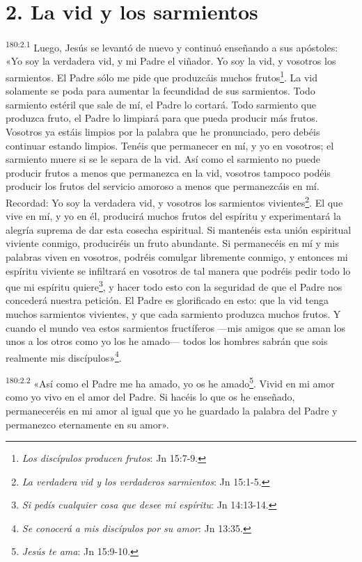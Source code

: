 \section*{2. La vid y los sarmientos}
\par 
\textsuperscript{180:2.1} Luego, Jesús se levantó de nuevo y continuó enseñando a sus apóstoles: «Yo soy la verdadera vid, y mi Padre el viñador. Yo soy la vid, y vosotros los sarmientos. El Padre sólo me pide que produzcáis muchos frutos\footnote{\textit{Los discípulos producen frutos}: Jn 15:7-9.}. La vid solamente se poda para aumentar la fecundidad de sus sarmientos. Todo sarmiento estéril que sale de mí, el Padre lo cortará. Todo sarmiento que produzca fruto, el Padre lo limpiará para que pueda producir más frutos. Vosotros ya estáis limpios por la palabra que he pronunciado, pero debéis continuar estando limpios. Tenéis que permanecer en mí, y yo en vosotros; el sarmiento muere si se le separa de la vid. Así como el sarmiento no puede producir frutos a menos que permanezca en la vid, vosotros tampoco podéis producir los frutos del servicio amoroso a menos que permanezcáis en mí. Recordad: Yo soy la verdadera vid, y vosotros los sarmientos vivientes\footnote{\textit{La verdadera vid y los verdaderos sarmientos}: Jn 15:1-5.}. El que vive en mí, y yo en él, producirá muchos frutos del espíritu y experimentará la alegría suprema de dar esta cosecha espiritual. Si mantenéis esta unión espiritual viviente conmigo, produciréis un fruto abundante. Si permanecéis en mí y mis palabras viven en vosotros, podréis comulgar libremente conmigo, y entonces mi espíritu viviente se infiltrará en vosotros de tal manera que podréis pedir todo lo que mi espíritu quiere\footnote{\textit{Si pedís cualquier cosa que desee mi espíritu}: Jn 14:13-14.}, y hacer todo esto con la seguridad de que el Padre nos concederá nuestra petición. El Padre es glorificado en esto: que la vid tenga muchos sarmientos vivientes, y que cada sarmiento produzca muchos frutos. Y cuando el mundo vea estos sarmientos fructíferos ---mis amigos que se aman los unos a los otros como yo los he amado--- todos los hombres sabrán que sois realmente mis discípulos»\footnote{\textit{Se conocerá a mis discípulos por su amor}: Jn 13:35.}.

\par 
\textsuperscript{180:2.2} «Así como el Padre me ha amado, yo os he amado\footnote{\textit{Jesús te ama}: Jn 15:9-10.}. Vivid en mi amor como yo vivo en el amor del Padre. Si hacéis lo que os he enseñado, permaneceréis en mi amor al igual que yo he guardado la palabra del Padre y permanezco eternamente en su amor».

